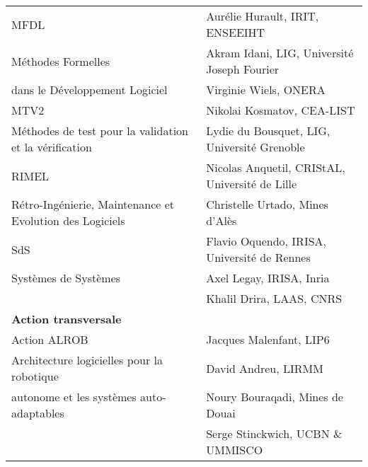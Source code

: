 \documentclass[11pt]{article}
\newcommand{\mynote}[3][black]{\textcolor{#1}{\fbox{\bfseries\sffamily\scriptsize{#2}}
{\small$\blacktriangleright$\textsf{\emph{#3}}$\blacktriangleleft$}}}
\newcommand{\pem}[1]{} %
\begin{document}
{\begin{tabular}{|p{6cm}p{8.5cm}|}
MFDL 
& Aurélie Hurault, IRIT, ENSEEIHT\\
\footnotesize  Méthodes Formelles
& Akram Idani, LIG, Université Joseph Fourier\\
\footnotesize  dans le Développement Logiciel 
& Virginie Wiels, ONERA\\
\hline

MTV2 &Nikolai Kosmatov, CEA-LIST\\
\footnotesize Méthodes de test pour la validation et la vérification  
     & Lydie du Bousquet, LIG, Université Grenoble\\
\hline

RIMEL 
& Nicolas Anquetil, CRIStAL, Université de Lille\\
\footnotesize Rétro-Ingénierie, Maintenance et Evolution des Logiciels
& Christelle Urtado, Mines d'Alès\\
\hline

SdS 
& Flavio Oquendo, IRISA, Université de Rennes\\
\footnotesize Systèmes de Systèmes
& Axel Legay, IRISA, Inria\\
& Khalil Drira, LAAS, CNRS\\

\hline 
\textbf{Action transversale}&\\
\hline 

Action ALROB & Jacques Malenfant, LIP6\\
\footnotesize
Architecture logicielles pour la robotique 
             &David Andreu, LIRMM\\
\footnotesize
autonome et les systèmes auto-adaptables
             &Noury Bouraqadi, Mines de Douai\\
             &Serge Stinckwich, UCBN \& UMMISCO\\
\hline

\hline


\hline
		\end{tabular}
}

\medskip

\noindent
\end{document}
